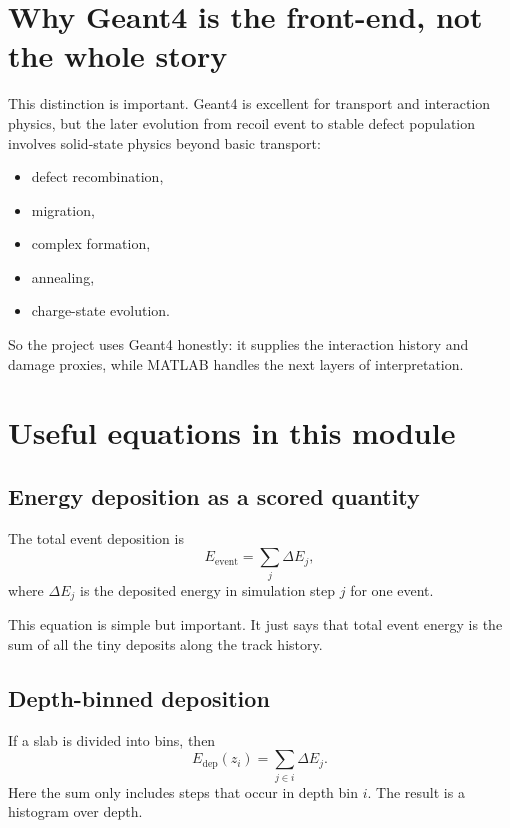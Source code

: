 \documentclass[11pt]{article}
\begin{document}
\section{Why Geant4 is the front-end, not the whole story}
This distinction is important. Geant4 is excellent for transport and interaction physics, but the later evolution from recoil event to stable defect population involves solid-state physics beyond basic transport:
\begin{itemize}
    \item defect recombination,
    \item migration,
    \item complex formation,
    \item annealing,
    \item charge-state evolution.
\end{itemize}

So the project uses Geant4 honestly: it supplies the interaction history and damage proxies, while MATLAB handles the next layers of interpretation.

\section{Useful equations in this module}
\subsection{Energy deposition as a scored quantity}
The total event deposition is
\begin{equation}
E_{\mathrm{event}} = \sum_j \Delta E_j,
\end{equation}
where $\Delta E_j$ is the deposited energy in simulation step $j$ for one event.

This equation is simple but important. It just says that total event energy is the sum of all the tiny deposits along the track history.

\subsection{Depth-binned deposition}
If a slab is divided into bins, then
\begin{equation}
E_{\mathrm{dep}}(z_i) = \sum_{j \in i} \Delta E_j.
\end{equation}
Here the sum only includes steps that occur in depth bin $i$. The result is a histogram over depth.
\end{document}
